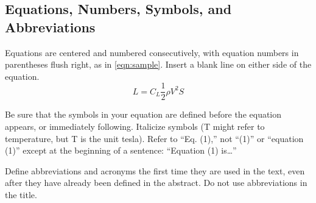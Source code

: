 \subsection{Equations, Numbers, Symbols, and Abbreviations}
Equations are centered and numbered consecutively, with equation numbers in parentheses flush right, as in \cref{eqn:sample}. Insert a blank line on either side of the equation.
\begin{equation}
    \label{eqn:sample}
    L = C_L \frac{1}{2}\rho V^2 S
\end{equation}

\noindent Be sure that the symbols in your equation are defined before the equation appears, or immediately following. Italicize symbols (T might refer to temperature, but T is the unit tesla). Refer to “Eq. (1),” not “(1)” or “equation (1)” except at the beginning of a sentence: “Equation (1) is…”

Define abbreviations and acronyms the first time they are used in the text, even after they have already been defined in the abstract. Do not use abbreviations in the title.

